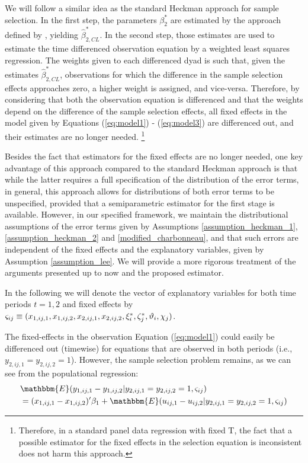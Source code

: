 We will follow a similar idea as the standard Heckman approach for sample selection. In the first step, the parameters $\beta_2^*$ are estimated by the approach defined by \cite{charbonneau2017multiple}, yielding $\hat{\beta}_{2,CL}^*$. In the second step, those estimates are used to estimate the time differenced observation equation by a weighted least squares regression. The weights given to each differenced dyad is such that, given the estimates $\hat{\beta}_{2,CL}^*$, observations for which the difference in the sample selection effects approaches zero, a higher weight is assigned, and vice-versa. Therefore, by considering that both the observation equation is differenced and that the weights depend on the difference of the sample selection effects, all fixed effects in the model given by Equations (\ref{eq:model1}) - (\ref{eq:model3}) are differenced out, and their estimates are no longer needed. \footnote{Therefore, in a standard panel data regression with fixed T, the fact that a possible estimator for the fixed effects in the selection equation is inconsistent does not harm this approach.}

Besides the fact that estimators for the fixed effects are no longer needed, one key advantage of this approach compared to the standard Heckman approach is that while the latter requires a full specification of the distribution of the error terms, in general, this approach allows for distributions of both error terms to be unspecified, provided that a semiparametric estimator for the first stage is available. However, in our specified framework, we maintain the distributional assumptions of the error terms given by Assumptions \ref{assumption_heckman_1}, \ref{assumption_heckman_2} and \ref{modified_charbonneau}, and that such errors are independent of the fixed effects and the explanatory variables, given by Assumption \ref{assumption_lee}. We will provide a more rigorous treatment of the arguments presented up to now and the proposed estimator.

In the following we will denote the vector of explanatory variables for both time periods $t=1,2$ and fixed effects by $\varsigma_{ij} \equiv (x_{1,ij,1}, x_{1,ij,2}, x_{2,ij,1}, x_{2,ij,2}, \\ \xi_i^*, \zeta_j^*, \vartheta_i, \chi_j)$. 

The fixed-effects in the observation Equation (\ref{eq:model1}) could easily be differenced out (timewise) for equations that are observed in both periods (i.e., $y_{2,ij,1} = y_{2,ij,2} = 1$). However, the sample selection problem remains, as we can see  from the populational regression:
\begin{align} \label{eq:kyri1}
    &\mathbbm{E}(y_{1,ij,1} - y_{1,ij,2} \rvert y_{2,ij,1} = y_{2,ij,2} = 1, \varsigma_{ij}) \\
    &= (x_{1,ij,1} - x_{1,ij,2})' \beta_1 + \mathbbm{E} (u_{ij,1} - u_{ij,2} \rvert y_{2,ij,1} = y_{2,ij,2} = 1, \varsigma_{ij} ) \nonumber
\end{align}

